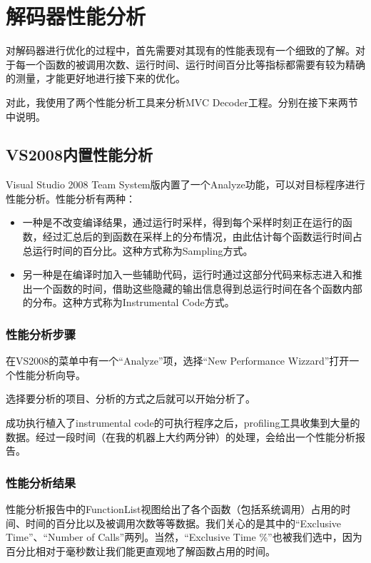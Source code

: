 \section{解码器性能分析}
\label{sec:decoderprofiling}

对解码器进行优化的过程中，首先需要对其现有的性能表现有一个细致的了解。对于每一个函数的被调用次数、运行时间、运行时间百分比等指标都需要有较为精确的测量，才能更好地进行接下来的优化。

对此，我使用了两个性能分析工具来分析MVC Decoder工程。分别在接下来两节中说明。

\subsection{VS2008内置性能分析}
\label{subsec:vsprofiling}
Visual Studio 2008 Team System版内置了一个Analyze功能，可以对目标程序进行性能分析。性能分析有两种：
\begin{itemize}
\item 一种是不改变编译结果，通过运行时采样，得到每个采样时刻正在运行的函数，经过汇总后的到函数在采样上的分布情况，由此估计每个函数运行时间占总运行时间的百分比。这种方式称为Sampling方式。
\item 另一种是在编译时加入一些辅助代码，运行时通过这部分代码来标志进入和推出一个函数的时间，借助这些隐藏的输出信息得到总运行时间在各个函数内部的分布。这种方式称为Instrumental Code方式。
\end{itemize}

\subsubsection{性能分析步骤}
\label{subsubsec:profilingprocess}

在VS2008的菜单中有一个“Analyze”项，选择“New Performance Wizzard”打开一个性能分析向导。

选择要分析的项目、分析的方式之后就可以开始分析了。

成功执行植入了instrumental code的可执行程序之后，profiling工具收集到大量的数据。经过一段时间（在我的机器上大约两分钟）的处理，会给出一个性能分析报告。

\subsubsection{性能分析结果}
\label{subsubsec:reportexerpt}

性能分析报告中的FunctionList视图给出了各个函数（包括系统调用）占用的时间、时间的百分比以及被调用次数等等数据。我们关心的是其中的“Exclusive Time”、“Number of Calls”两列。当然，“Exclusive Time \%”也被我们选中，因为百分比相对于毫秒数让我们能更直观地了解函数占用的时间。

